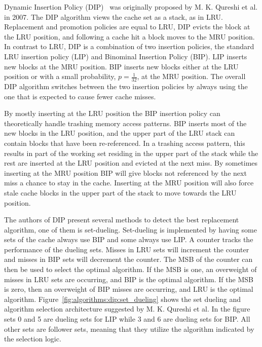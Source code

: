 Dynamic Insertion Policy (DIP)~\cite{Qureshi2007} was originally proposed by M. K. Qureshi et al. in 2007.
The DIP algorithm views the cache set as a stack, as in LRU.
Replacement and promotion policies are equal to LRU, DIP evicts the block at the LRU position, and following a cache hit a block moves to the MRU position.
In contrast to LRU, DIP is a combination of two insertion policies, the standard LRU insertion policy (LIP) and Binominal Insertion Policy (BIP).
LIP inserts new blocks at the MRU position.
BIP inserts new blocks either at the LRU position or with a small probability, $p = \frac{1}{32}$, at the MRU position. 
The overall DIP algorithm switches between the two insertion policies by always using the one that is expected to cause fewer cache misses.

By mostly inserting at the LRU position the BIP insertion policy can theoretically handle trashing memory access patterns.
BIP inserts most of the new blocks in the LRU position, and the upper part of the LRU stack can contain blocks that have been re-referenced.
In a trashing access pattern, this results in part of the working set residing in the upper part of the stack while the rest are inserted at the LRU position and evicted at the next miss.
By sometimes inserting at the MRU position BIP will give blocks not referenced by the next miss a chance to stay in the cache. 
Inserting at the MRU position will also force stale cache blocks in the upper part of the stack to move towards the LRU position.

The authors of DIP present several methods to detect the best replacement algorithm, one of them is set-dueling.
Set-dueling is implemented by having some sets of the cache always use BIP and some always use LIP.
A counter tracks the performance of the dueling sets.
Misses in LRU sets will increment the counter and misses in BIP sets will decrement the counter.
The MSB of the counter can then be used to select the optimal algorithm.
If the MSB is one, an overweight of misses in LRU sets are occurring, and BIP is the optimal algorithm. 
If the MSB is zero, then an overweight of BIP misses are occurring, and LRU is the optimal algorithm.
Figure~\ref{fig:algorithms:dip:set_dueling} shows the set dueling and algorithm selection architecture suggested by M. K. Qureshi et al.
In the figure sets 0 and 5 are dueling sets for LIP while 3 and 6 are dueling sets for BIP.
All other sets are follower sets, meaning that they utilize the algorithm indicated by the selection logic.

